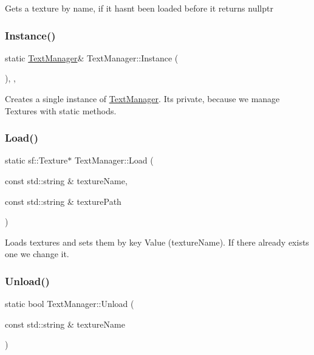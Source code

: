 Gets a texture by name, if it hasn\textquotesingle{}t been loaded before it returns nullptr \mbox{\label{class_text_manager_aef625a6be5a7239925609ba62acdf1a9}} 
\subsubsection{\texorpdfstring{Instance()}{Instance()}}
{\footnotesize\ttfamily static \mbox{\hyperlink{class_text_manager}{Text\+Manager}}\& Text\+Manager\+::\+Instance (\begin{DoxyParamCaption}{ }\end{DoxyParamCaption})\hspace{0.3cm}{\ttfamily [inline]}, {\ttfamily [static]}, {\ttfamily [private]}}

Creates a single instance of \mbox{\hyperlink{class_text_manager}{Text\+Manager}}. It\textquotesingle{}s private, because we manage Textures with static methods. \mbox{\label{class_text_manager_a1c84d24abb82f311818f38e4f9c635df}} 
\subsubsection{\texorpdfstring{Load()}{Load()}}
{\footnotesize\ttfamily static sf\+::\+Texture$\ast$ Text\+Manager\+::\+Load (\begin{DoxyParamCaption}\item[{const std\+::string \&}]{texture\+Name,  }\item[{const std\+::string \&}]{texture\+Path }\end{DoxyParamCaption})\hspace{0.3cm}{\ttfamily [static]}}

Loads textures and sets them by key Value (texture\+Name). If there already exists one we change it. \mbox{\label{class_text_manager_a3af7a053bdcd759d13d2759c3434a4a1}} 
\subsubsection{\texorpdfstring{Unload()}{Unload()}}
{\footnotesize\ttfamily static bool Text\+Manager\+::\+Unload (\begin{DoxyParamCaption}\item[{const std\+::string \&}]{texture\+Name }\end{DoxyParamCaption})\hspace{0.3cm}{\ttfamily [static]}}

